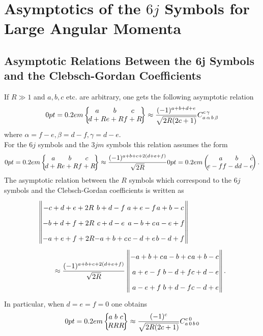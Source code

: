 \section{Asymptotics of the $6 j$ Symbols for Large Angular Momenta}\label{sec:9.9}
\subsection{Asymptotic Relations Between the 6j Symbols and the Clebsch-Gordan Coefficients}\label{sec:9.9.1}
If $R \gg 1$ and $a, b, c$ etc. are arbitrary, one gets the following asymptotic relation
\begin{equation}
\sixj{a}{b}{c}{d+R}{e+R}{f+R}  \label{eq:9:9:1} \approx \frac{(-1)^{a+b+d+e}}{\sqrt{2 R(2 c+1)}} \clebsch{a}{\alpha}{b}{\beta}{c}{\gamma}
\end{equation}
where $\alpha=f-e, \beta=d-f, \gamma=d-e$.\\
For the $6 j$ symbols and the $3 j m$ symbols this relation assumes the form \cite{ref047}
\begin{equation}
\sixj{a}{b}{c}{d+R}{e+R}{f+R}  \label{eq:9:9:2} \approx \frac{(-1)^{a+b+c+2(d+e+f)}}{\sqrt{2 R}}\threej{a }{ b }{ c }{e-f }{ f-d }{ d-e} .
\end{equation}
The asymptotic relation between the $R$ symbols which correspond to the $6 j$ symbols and the Clebsch-Gordan coefficients is written as
\begin{align}
\MoveEqLeft{\begin{Vmatrix}
-c+d+e+2 R & b+d-f & a+e-f & a+b-c \\
-b+d+f+2 R & c+d-e & a-b+c & a-e+f \\
-a+e+f+2 R & -a+b+c & c-d+e & b-d+f
\end{Vmatrix}} \notag\\
& \approx \frac{(-1)^{a+b+c+2(d+e+f)}}{\sqrt{2 R}}
\begin{Vmatrix}
-a+b+c & a-b+c & a+b-c \\
a+e-f & b-d+f & c+d-e \\
a-e+f & b+d-f & c-d+e
\end{Vmatrix}    . \label{eq:9:9:3}
\end{align}
In particular, when $d=e=f=0$ one obtains \cite{ref060}
\begin{equation}
\sixj{a}{b}{c}{R}{R}{R}  \label{eq:9:9:4} \approx \frac{(-1)^{c}}{\sqrt{2 R(2 c+1)}} \clebsch{a}{0}{b}{0}{c}{0}
\end{equation}
